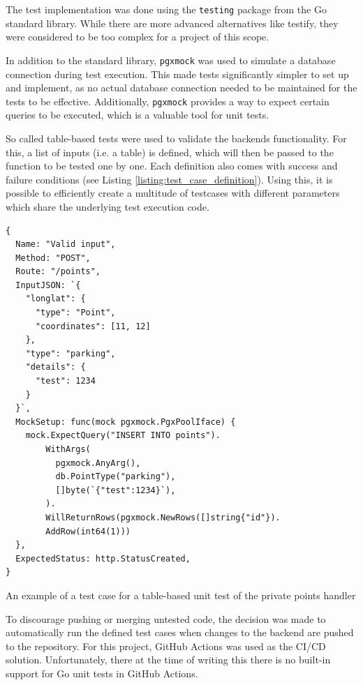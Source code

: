 The test implementation was done using the \texttt{testing} package from the Go
standard library. While there are more advanced alternatives like testify, they
were considered to be too complex for a project of this scope.

In addition to the standard library, \texttt{pgxmock} was used to simulate a
database connection during test execution. This made tests significantly simpler
to set up and implement, as no actual database connection needed to be
maintained for the tests to be effective. Additionally, \texttt{pgxmock}
provides a way to expect certain queries to be executed, which is a valuable
tool for unit tests.

So called table-based tests were used to validate the backends functionality.
For this, a list of inputs (i.e. a table) is defined, which will then be passed
to the function to be tested one by one. Each definition also comes with success
and failure conditions (see Listing \ref{listing:test_case_definition}). Using
this, it is possible to efficiently create a multitude of testcases with
different parameters which share the underlying test execution code.

\newpage{}

\begin{listing}[htbp]
  \centering{}
  \begin{minipage}{0.7\textwidth}
  \begin{verbatim}
{
  Name: "Valid input",
  Method: "POST",
  Route: "/points",
  InputJSON: `{
    "longlat": {
      "type": "Point",
      "coordinates": [11, 12]
    },
    "type": "parking",
    "details": {
      "test": 1234
    }
  }`,
  MockSetup: func(mock pgxmock.PgxPoolIface) {
    mock.ExpectQuery("INSERT INTO points").
        WithArgs(
          pgxmock.AnyArg(),
          db.PointType("parking"),
          []byte(`{"test":1234}`),
        ).
        WillReturnRows(pgxmock.NewRows([]string{"id"}).
        AddRow(int64(1)))
  },
  ExpectedStatus: http.StatusCreated,
}
  \end{verbatim}
  \end{minipage}
  \caption{An example of a test case for a table-based unit test of the private points handler}
  \label{listing:test_case_definition}
\end{listing}

To discourage pushing or merging untested code, the decision was made to
automatically run the defined test cases when changes to the backend are pushed
to the repository. For this project, GitHub Actions was used as the CI/CD
solution. Unfortunately, there at the time of writing this there is no built-in
support for Go unit tests in GitHub Actions.

